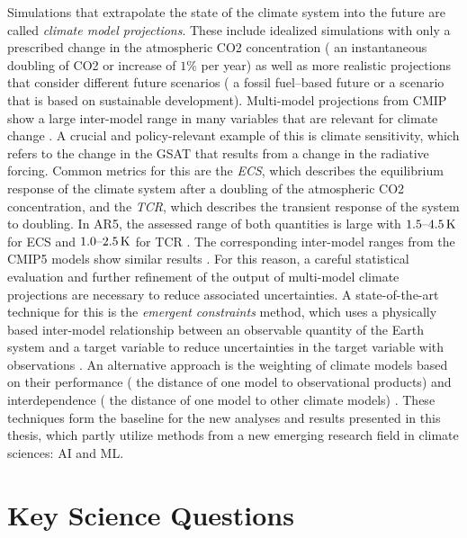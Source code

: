 Simulations that extrapolate the state of the climate system into the future
are called \emph{climate model projections}. These include idealized
simulations with only a prescribed change in the atmospheric \ac{CO2}
concentration (\eg{} an instantaneous doubling of \ac{CO2} or 
increase of $1 \unit{\%}$ per year) as well as more realistic projections that
consider different future scenarios (\eg{} a fossil fuel--based future or a
scenario that is based on sustainable development). Multi-model projections
from \ac{CMIP} show a large inter-model range in many variables that are
relevant for climate change \autocite{Collins2013, Flato2013}. A crucial and
policy-relevant example of this is climate sensitivity, which refers to the
change in the \ac{GSAT} that results from a change in the radiative forcing.
Common metrics for this are the \emph{\ac{ECS}}, which describes the
equilibrium response of the climate system after a doubling of the atmospheric
\ac{CO2} concentration, and the \emph{\ac{TCR}}, which describes the transient
response of the system to  doubling. In \acs{AR}5, the assessed range
of both quantities is large with $\rangeunit{1.5}{4.5}{K}$ for \ac{ECS} and
$\rangeunit{1.0}{2.5}{K}$ for \ac{TCR} \autocite{Stocker2013}. The
corresponding inter-model ranges from the \acs{CMIP}5 models show similar
results \autocite{Flato2013}. For this reason, a careful statistical evaluation
and further refinement of the output of multi-model climate projections are
necessary to reduce associated uncertainties. A state-of-the-art technique for
this is the \emph{emergent constraints} method, which uses a physically based
inter-model relationship between an observable quantity of the Earth system and
a target variable to reduce uncertainties in the target variable with
observations \autocite{Allen2002}. An alternative approach is the weighting of
climate models based on their performance (\ie{} the distance of one model to
observational products) and interdependence (\ie{} the distance of one model to
other climate models) \autocite{Knutti2017a}. These techniques form the
baseline for the new analyses and results presented in this thesis, which
partly utilize methods from a new emerging research field in climate sciences:
\ac{AI} and \ac{ML}.


\section{Key Science Questions}
\label{sec:01:key_science_questions}

